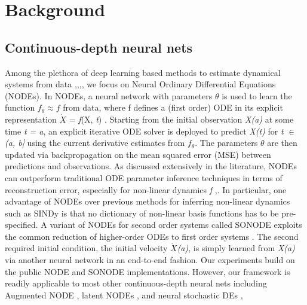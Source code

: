 \documentclass{article}
\begin{document}
\section{Background}
    \subsection{Continuous-depth neural nets}
    Among the plethora of deep learning based methods to estimate dynamical systems from data
    \cite{Bolstad_2011},\cite{bartoldson2020generalizationstability},\cite{Aalto2020},\cite{Arnab20}, we focus on Neural Ordinary Differential Equations (NODEs). In NODEs, a neural
    network with parameters $\theta$  is used to learn the function $f_{\theta} \approx f$
    from data, where f defines a (first
    order) ODE in its explicit representation \textit{$\dot{X}$} = \textit{f}(X, \textit{t}) \cite{Allen-Zhu18}. Starting from the initial observation \textit{X(a)}
    at some time \textit{t = a}, an explicit iterative ODE solver is deployed to predict \textit{X(t)} for \textit{t $\in$ (a, b]} using
    the current derivative estimates from $f_{\theta}$. The parameters $\theta$ are then updated via backpropagation
    on the mean squared error (MSE) between predictions and observations. As discussed extensively
    in the literature, NODEs can outperform traditional ODE parameter inference techniques in terms
    of reconstruction error, especially for non-linear dynamics \textit{f} \cite{Deen2021},\cite{chen2020learning}. In particular, one advantage
    of NODEs over previous methods for inferring non-linear dynamics such as SINDy \cite{mooij2013ordinary} is that no
    dictionary of non-linear basis functions has to be pre-specified.
    A variant of NODEs for second order systems called SONODE exploits the common reduction
    of higher-order ODEs to first order systems \cite{Du18}. The second required initial condition, the initial
    velocity \textit{$\dot{X}$(a)}, is simply learned from \textit{X(a)} via another neural network in an end-to-end fashion. Our
    experiments build on the public NODE and SONODE implementations. However, our framework
    is readily applicable to most other continuous-depth neural nets including Augmented NODE \cite{Arnab20},
    latent NODEs \cite{Aalto2020}, and neural stochastic DEs \cite{hoefler2021sparsity},\cite{Zheng18}

    
\end{document}
